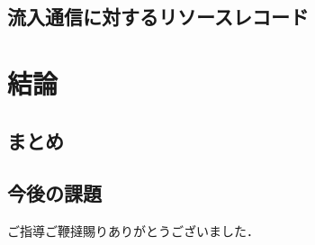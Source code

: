 \documentclass[12pt]{jarticle} %
\begin{document}
\subsection{流入通信に対するリソースレコード}

\newpage
\section{結論}
\subsection{まとめ}
\subsection{今後の課題}


\newpage
\acknowledgements
ご指導ご鞭撻賜りありがとうございました．
\end{document}

